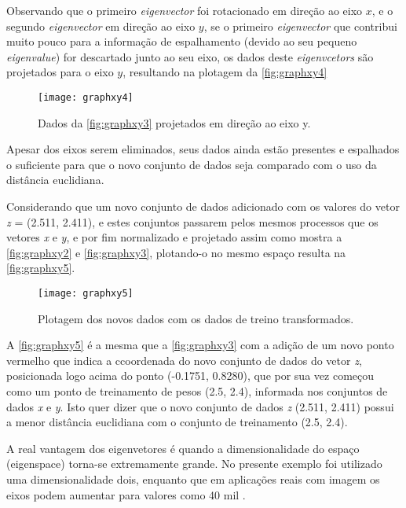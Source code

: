 Observando que o primeiro \textit{eigenvector} foi rotacionado em direção ao eixo $x$, e o segundo \textit{eigenvector} em direção ao eixo $y$, se o primeiro \textit{eigenvector} que contribui muito pouco para a informação de espalhamento (devido ao seu pequeno \textit{eigenvalue}) for descartado junto ao seu eixo, os dados deste \textit{eigenvcetors} são projetados para o eixo $y$, resultando na plotagem da \autoref{fig:graphxy4}

\begin{figure}[h]
	\centering
	\texttt{[image: graphxy4]}
	\caption{Dados da \autoref{fig:graphxy3} projetados em direção ao eixo y.}
	\label{fig:graphxy4}
\end{figure}


Apesar dos eixos serem eliminados, seus dados ainda estão presentes e espalhados o suficiente para que o novo conjunto de dados seja comparado com o uso da distância euclidiana.

Considerando que um novo conjunto de dados adicionado com os valores do vetor \textit{z} = (2.511, 2.411), e estes conjuntos passarem pelos mesmos processos que os vetores \textit{x} e \textit{y}, e por fim normalizado e projetado assim como mostra a \autoref{fig:graphxy2} e \autoref{fig:graphxy3}, plotando-o no mesmo espaço resulta na \autoref{fig:graphxy5}.

\begin{figure}[h]
	\centering
	\texttt{[image: graphxy5]}
	\caption{Plotagem dos novos dados com os dados de treino transformados.}
	\label{fig:graphxy5}
\end{figure}

A \autoref{fig:graphxy5} é a mesma que a \autoref{fig:graphxy3} com a adição de um novo ponto vermelho que indica a ccoordenada do novo conjunto de dados do vetor \textit{z}, posicionada logo acima do ponto (-0.1751, 0.8280), que por sua vez começou como um ponto de treinamento de pesos (2.5, 2.4), informada nos conjuntos de dados \textit{x} e \textit{y}. Isto quer dizer que o novo conjunto de dados \textit{z} (2.511, 2.411) possui a menor distância euclidiana com o conjunto de treinamento (2.5, 2.4). 

A real vantagem dos eigenvetores é quando a dimensionalidade do espaço (eigenspace) torna-se extremamente grande. No presente exemplo foi utilizado uma dimensionalidade dois, enquanto que em aplicações reais com imagem os eixos podem aumentar para valores como 40 mil \cite{drmathew_java_programming}.

